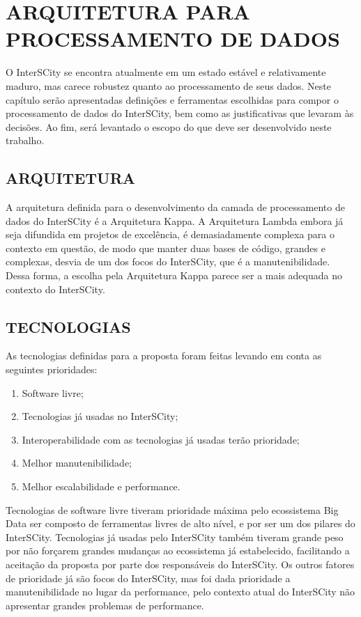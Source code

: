 \chapter[ARQUITETURA PARA PROCESSAMENTO DE DADOS]{ARQUITETURA PARA PROCESSAMENTO DE DADOS}
\label{chapter:architecture}

O InterSCity se encontra atualmente em um estado estável e relativamente maduro,
mas carece robustez quanto ao processamento de seus dados. Neste capítulo serão
apresentadas definições e ferramentas escolhidas para compor o processamento
de dados do InterSCity, bem como as justificativas que levaram às decisões. Ao
fim, será levantado o escopo do que deve ser desenvolvido neste trabalho.

\section{ARQUITETURA}

A arquitetura definida para o desenvolvimento da camada de processamento de
dados do InterSCity é a Arquitetura Kappa. A Arquitetura Lambda embora já seja
difundida em projetos de excelência, é demasiadamente complexa para o contexto
em questão, de modo que manter duas bases de código, grandes e complexas,
desvia de um dos focos do InterSCity, que é a manutenibilidade. Dessa forma, a
escolha pela Arquitetura Kappa parece ser a mais adequada no contexto do
InterSCity.

\section{TECNOLOGIAS}

As tecnologias definidas para a proposta foram feitas levando em conta as
seguintes prioridades:

\begin{enumerate}
    \item Software livre;
    \item Tecnologias já usadas no InterSCity;
    \item Interoperabilidade com as tecnologias já usadas terão prioridade;
    \item Melhor manutenibilidade;
    \item Melhor escalabilidade e performance.
\end{enumerate}

Tecnologias de software livre tiveram prioridade máxima pelo
ecossistema Big Data ser composto de ferramentas livres de alto nível, e por
ser um dos pilares do InterSCity. Tecnologias já usadas pelo InterSCity também
tiveram grande peso por não forçarem grandes mudanças ao ecossistema já
estabelecido, facilitando a aceitação da proposta por parte dos responsáveis do
InterSCity. Os outros fatores de prioridade já são focos do InterSCity,
mas foi dada prioridade a manutenibilidade no lugar da performance, pelo
contexto atual do InterSCity não apresentar grandes problemas de performance.

